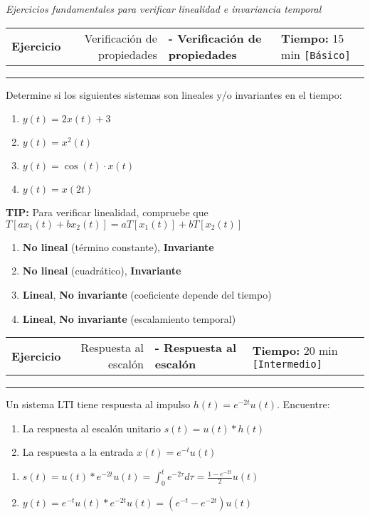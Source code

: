 \documentclass[11pt]{article}
\makeatletter
\newcommand{\basico}{\texttt{[Básico]}}
\newcommand{\intermedio}{\texttt{[Intermedio]}}
\newcounter{ejercicio}
\newenvironment{ejercicio}[3][]{%
  \stepcounter{ejercicio}
  \vspace{0.6cm}
  \noindent\begin{tabularx}{\linewidth}{@{} X r @{}}
    \textbf{Ejercicio \theejercicio} \ifx&#1&\else\textbf{ - #1}\fi
    &
    \textbf{Tiempo:} #2 min \quad #3
  \end{tabularx}
  \hrule
  \vspace{0.3cm}
}{%
  \vspace{0.5cm}
}
\newcommand{\tip}[1]{%
  \begin{tcolorbox}[
    colback=black!5,
    colframe=black!60,
    boxrule=1pt,
    rounded corners=3pt,
    left=8pt,
    right=8pt,
    top=5pt,
    bottom=5pt
  ]
  \textbf{TIP:} #1
  \end{tcolorbox}
}
\newif\ifsoluciones
\newenvironment{solucion}{%
  \ifsoluciones
    \vspace{0.3cm}
    \begin{tcolorbox}[
      enhanced,
      breakable,
      colback=black!5,
      colframe=black!50,
      boxrule=1pt,
      rounded corners=5pt,
      left=8pt,
      right=8pt,
      top=8pt,
      bottom=8pt,
      title={\textbf{SOLUCIÓN}},
      fonttitle=\bfseries
    ]
  \fi
}{%
  \ifsoluciones
    \end{tcolorbox}
  \fi
}
\newcommand{\espaciotrabajo}[1][5cm]{\vspace{#1}}
\newenvironment{grupoejercicio}[2]{%
  \vspace{0.8cm}
  \begin{tcolorbox}[
    enhanced,
    colback=black!5,
    colframe=black,
    boxrule=1pt,
    rounded corners=8pt,
    title={\textbf{#1}},
    fonttitle=\Large\bfseries
  ]
  \textit{#2}
  \end{tcolorbox}
  \vspace{0.3cm}
}{%
  \vspace{0.5cm}
}
\makeatother
\begin{document}
\begin{grupoejercicio}{Propiedades de Sistemas LTI}{Ejercicios fundamentales para verificar linealidad e invariancia temporal}

\begin{ejercicio}[Verificación de propiedades]{15}{\basico}
  Determine si los siguientes sistemas son lineales y/o invariantes en el tiempo:
  
  \begin{enumerate}[label=\alph*)]
    \item $y(t) = 2x(t) + 3$
    \item $y(t) = x^2(t)$
    \item $y(t) = \cos(t) \cdot x(t)$
    \item $y(t) = x(2t)$
  \end{enumerate}
  
  \tip{Para verificar linealidad, compruebe que $T[ax_1(t) + bx_2(t)] = aT[x_1(t)] + bT[x_2(t)]$}
  
  \espaciotrabajo[6cm]
  
  \begin{solucion}
    \begin{enumerate}[label=\alph*)]
      \item \textbf{No lineal} (término constante), \textbf{Invariante}
      \item \textbf{No lineal} (cuadrático), \textbf{Invariante}
      \item \textbf{Lineal}, \textbf{No invariante} (coeficiente depende del tiempo)
      \item \textbf{Lineal}, \textbf{No invariante} (escalamiento temporal)
    \end{enumerate}
  \end{solucion}
\end{ejercicio}

\begin{ejercicio}[Respuesta al escalón]{20}{\intermedio}
  Un sistema LTI tiene respuesta al impulso $h(t) = e^{-2t}u(t)$. Encuentre:
  
  \begin{enumerate}[label=\alph*)]
    \item La respuesta al escalón unitario $s(t) = u(t) * h(t)$
    \item La respuesta a la entrada $x(t) = e^{-t}u(t)$
  \end{enumerate}
  
  \espaciotrabajo[8cm]
  
  \begin{solucion}
    \begin{enumerate}[label=\alph*)]
      \item $s(t) = u(t) * e^{-2t}u(t) = \int_0^t e^{-2\tau}d\tau = \frac{1-e^{-2t}}{2}u(t)$
      \item $y(t) = e^{-t}u(t) * e^{-2t}u(t) = (e^{-t} - e^{-2t})u(t)$
    \end{enumerate}
  \end{solucion}
\end{ejercicio}

\end{grupoejercicio}
\end{document}
